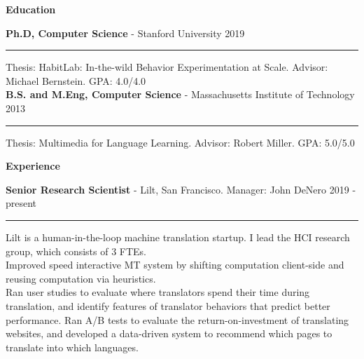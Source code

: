 \documentclass[10pt,A4]{article}
\newcommand{\cvsection}[1]
{
	\begin{center}
		\large\textcolor{sectcol}{\textbf{#1}}
	\end{center}
}
\newcommand{\cvevent}[5]
{

	\textbf{#2} - \textcolor{bgcol}{#3} \hfill \vspace{2.5pt}\textcolor{sectcol}{#1}

\vspace{-8pt}
\textcolor{softcol}{\hrule}
\vspace{6pt}

  #4\\[3pt]
  #5\\[6pt]

}
\newcommand{\cvevtzero}[4]
{

	\textbf{#2} - \textcolor{bgcol}{#3} \hfill \vspace{2.5pt}\textcolor{sectcol}{#1}

\vspace{-8pt}
\textcolor{softcol}{\hrule}
\vspace{6pt}

}
\newcommand{\cvevtone}[4]
{

	\textbf{#2} - \textcolor{bgcol}{#3} \hfill \vspace{2.5pt}\textcolor{sectcol}{#1}

\vspace{-8pt}
\textcolor{softcol}{\hrule}
\vspace{6pt}

  #4\\[3pt]

}
\begin{document}
\cvsection{Education}

\cvevtone{2019}{Ph.D, Computer Science}{Stanford University}{Thesis: HabitLab: In-the-wild Behavior Experimentation at Scale. Advisor: Michael Bernstein. \hfill GPA: 4.0/4.0}%


%
\cvevtone{2013}{B.S. and M.Eng, Computer Science}{Massachusetts Institute of Technology}{Thesis: Multimedia for Language Learning. Advisor: Robert Miller. \hfill GPA: 5.0/5.0}


%


%


%
%

\cvsection{Experience}

\cvevtzero{2019 - present}{Senior Research Scientist}{Lilt, San Francisco. Manager: John DeNero}\\
Lilt is a human-in-the-loop machine translation startup. I lead the HCI research group, which consists of 3 FTEs.\\
Improved speed interactive MT system by shifting computation client-side and reusing computation via heuristics.\\
Ran user studies to evaluate where translators spend their time during translation, and identify features of translator behaviors that predict better performance. Ran A/B tests to evaluate the return-on-investment of translating websites, and developed a data-driven system to recommend which pages to translate into which languages.\\
\end{document}
